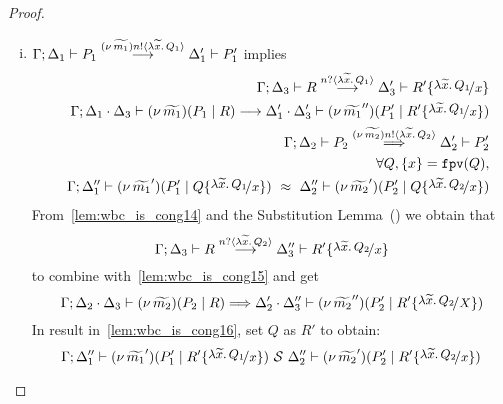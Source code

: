 \begin{proof}
\begin{enumerate}
\begin{enumerate}[i.]
				\item
						$\Gamma; \Delta_1 \vdash P_1 \stackrel{(\nu\, \widetilde{m_1}) n ! \langle \lambda \widetilde{x}.\,Q_1 \rangle}{\longrightarrow} \Delta_1' \vdash P_1'$
						implies
						\begin{eqnarray}
							& & \horel{\Gamma}{\Delta_3}{R}
							{\by{\bactinp{n}{\abs{\widetilde{x}} {Q_1}}}}{\Delta_3'}
							{R' \subst{\abs{\widetilde{x}}{Q_1}}{x}}
							\label{lem:wbc_is_cong14}\\
							& & \horel{\Gamma}{\Delta_1 \cat \Delta_3}{\newsp{\widetilde{m_1}}{P_1 \Par R}}
							{\by{}}{\Delta_1' \cat \Delta_3'}
							{\newsp{\widetilde{m_1}''}{P_1' \Par R' \subst{\abs{\widetilde{x}}{Q_1}}{x}}}
							\nonumber \\
							& & \horel{\Gamma}{\Delta_2}{P_2}
							{\By{\news{\widetilde{m_2}} \bactout{n}{\abs{\widetilde{x}}{Q_2}}}}
							{\Delta_2'}{P_2'}
							\label{lem:wbc_is_cong15}\\
							& & \forall Q, \set{x} = \fpv{Q}, \nonumber \\
							& & \horel{\Gamma}{\Delta_1''}{\newsp{\widetilde{m_1}'}{P_1' \Par Q \subst{\abs{\widetilde{x}}{Q_1}}{x}}}
							{\ \wbc\ }
							{\Delta_2''}{\newsp{\widetilde{m_2}'}{P_2' \Par Q \subst{\abs{\widetilde{x}}{Q_2}}{x}}}
							\label{lem:wbc_is_cong16}
						\end{eqnarray}
						From~\eqref{lem:wbc_is_cong14} and the Substitution Lemma~() we obtain that
						\[
							\horel{\Gamma}{\Delta_3}{R}{\by{\bactinp{n}{\abs{\widetilde{x}} {Q_2}}}}{\Delta_3''}{R' \subst{\abs{\widetilde{x}}{Q_2}}{x}}
						\]
						\noi to combine with~\eqref{lem:wbc_is_cong15} and get
						\[
							\horel{\Gamma}{\Delta_2 \cat \Delta_3}{\newsp{\widetilde{m_2}}{P_2 \Par R}}
							{\By{}}
							{\Delta_2' \cat \Delta_3''}{\newsp{\widetilde{m_2}''}{P_2' \Par R' \subst{\abs{\widetilde{x}}{Q_2}}{X}}}
						\]
						\noi In result in~\eqref{lem:wbc_is_cong16}, set $Q$ as $R'$ to obtain:
						\[
							\horel{\Gamma}{\Delta_1''}{\newsp{\widetilde{m_1}'}{P_1' \Par R' \subst{\abs{\widetilde{x}}{Q_1}}{x}}}
							{\ \mathcal{S}\ }{ \Delta_2''}
							{\newsp{\widetilde{m_2}'}{P_2' \Par R' \subst{\abs{\widetilde{x}}{Q_2}}{x}}}
						\]


\end{enumerate}
\end{enumerate}
\end{proof}
